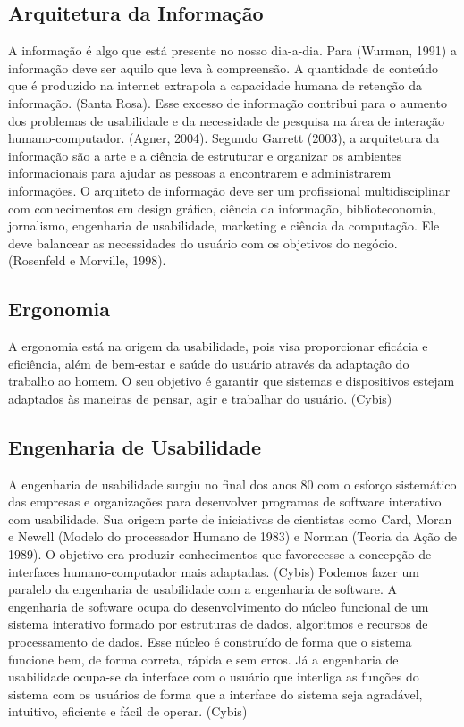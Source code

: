 	
\subsection{Arquitetura da Informação}

A informação é algo que está presente no nosso dia-a-dia. Para (Wurman, 1991) a informação deve ser aquilo que leva à compreensão. A quantidade de conteúdo que é produzido na internet extrapola a capacidade humana de retenção da informação. (Santa Rosa). Esse excesso de informação contribui para o aumento dos problemas de usabilidade e da necessidade de pesquisa na área de interação humano-computador. (Agner, 2004).
Segundo Garrett (2003), a arquitetura da informação são a arte e a ciência de estruturar e organizar os ambientes informacionais para ajudar as pessoas a encontrarem e administrarem informações.
O arquiteto de informação deve ser um profissional multidisciplinar com conhecimentos em design gráfico, ciência da informação, biblioteconomia, jornalismo, engenharia de usabilidade, marketing e ciência da computação. Ele deve balancear as necessidades do usuário com os objetivos do negócio. (Rosenfeld e Morville, 1998).

\subsection{Ergonomia}

A ergonomia está na origem da usabilidade, pois visa proporcionar eficácia e eficiência, além de bem-estar e saúde do usuário através da adaptação do trabalho ao homem. O seu objetivo é garantir que sistemas e dispositivos estejam adaptados às maneiras de pensar, agir e trabalhar do usuário. (Cybis) 


\subsection{Engenharia de Usabilidade}

A engenharia de usabilidade surgiu no final dos anos 80 com o esforço sistemático das empresas e organizações para desenvolver programas de software interativo com usabilidade. Sua origem parte de iniciativas de cientistas como Card, Moran e Newell (Modelo do processador Humano de 1983) e Norman (Teoria da Ação de 1989). O objetivo era produzir conhecimentos que favorecesse a concepção de interfaces humano-computador mais adaptadas. (Cybis)
%
Podemos fazer um paralelo da engenharia de usabilidade com a engenharia de software. A engenharia de software ocupa do desenvolvimento do núcleo funcional de um sistema interativo formado por estruturas de dados, algoritmos e recursos de processamento de dados. Esse núcleo é construído de forma que o sistema funcione bem, de forma correta, rápida e sem erros. Já a engenharia de usabilidade ocupa-se da interface com o usuário que interliga as funções do sistema com os usuários de forma que a interface do sistema seja agradável, intuitivo, eficiente e fácil de operar. (Cybis)


